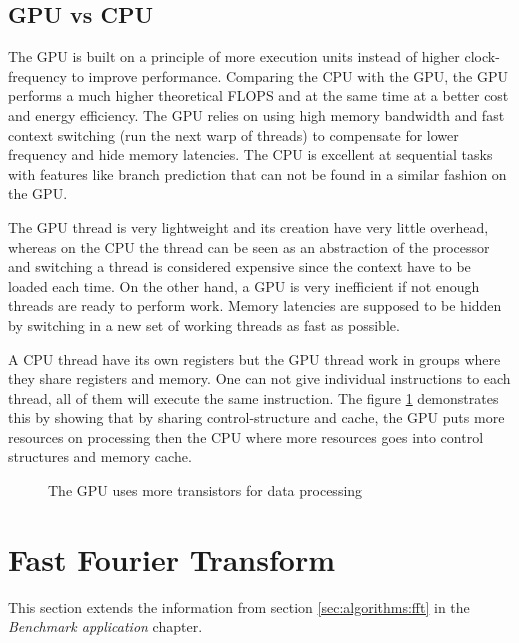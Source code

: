 \subsection{GPU vs CPU}

The \gls{GPU} is built on a principle of more execution units instead of higher clock-frequency to improve performance. Comparing the \gls{CPU} with the \gls{GPU}, the \gls{GPU} performs a much higher theoretical \gls{FLOPS} and at the same time at a better cost and energy efficiency\cite{owens2007survey}. The \gls{GPU} relies on using high memory bandwidth and fast context switching (run the next warp of threads) to compensate for lower frequency and hide memory latencies. The \gls{CPU} is excellent at sequential tasks with features like branch prediction that can not be found in a similar fashion on the \gls{GPU}.

The \gls{GPU} thread is very lightweight and its creation have very little overhead, whereas on the \gls{CPU} the thread can be seen as an abstraction of the processor and switching a thread is considered expensive since the context have to be loaded each time. On the other hand, a \gls{GPU} is very inefficient if not enough threads are ready to perform work. Memory latencies are supposed to be hidden by switching in a new set of working threads as fast as possible.

A \gls{CPU} thread have its own registers but the \gls{GPU} thread work in groups where they share registers and memory. One can not give individual instructions to each thread, all of them will execute the same instruction. The figure \ref{fig:gpu-vs-cpu} demonstrates this by showing that by sharing control-structure and cache, the \gls{GPU} puts more resources on processing then the \gls{CPU} where more resources goes into control structures and memory cache.

\begin{figure}
	\centering
	
	\caption{The \gls{GPU} uses more transistors for data processing}
	\label{fig:gpu-vs-cpu}
\end{figure}

\section{Fast Fourier Transform}

This section extends the information from section \ref{sec:algorithms:fft} in the \textit{Benchmark application} chapter.

